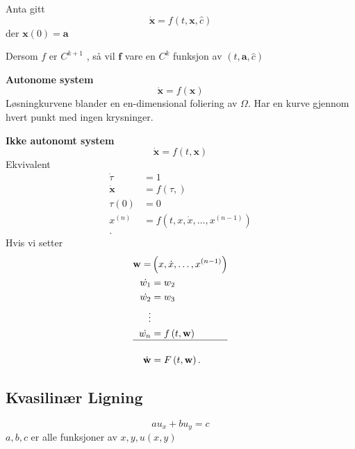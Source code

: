 \documentclass{article}
\theoremstyle{remark}
\newcommand{\newpara}
  {
  \vskip 0.4cm
  }
\begin{document}
\begin{theorem}
  Anta gitt \[
  \dot{\mathbf{x} } = f\left( t, \mathbf{x} , \hat{c} \right)
  \] 
  der $\mathbf{x}\left( 0 \right) = \mathbf{a}$ 
  \newpara
  Dersom $f$ er $C^{k+1}$ , så vil $\mathbf{f}$ vare en $C^{k}$ funksjon av $\left( t, \mathbf{a}, \hat{c} \right)$
\end{theorem}


\begin{tcolorbox}
  \textbf{Autonome system}  \[
\dot{\mathbf{x}} = f\left( \mathbf{x} \right)
  \] 
  Løsningkurvene blander en en-dimensional foliering av $\Omega $. Har en kurve gjennom hvert punkt med ingen krysninger.
  \newpara
  \textbf{Ikke autonomt system} 
  \[
  \dot{\mathbf{x}} = f\left( t, \mathbf{x} \right)
  \] 
  Ekvivalent 
  \begin{align*}
     \dot{\tau } &= 1 \\  
     \dot{\mathbf{x}}  & = f\left( \tau ,  \right)\\
    \tau \left( 0 \right) &= 0 \\ 
    x^{(n)} &= f\left( t, x, \dot{x} , \ldots, x^{(n-1)} \right) \\
  .\end{align*}
  Hvis vi setter 
  \begin{align*}
    \mathbf{w} = &  \left( x, \dot{x}, \ldots, x^{(n-1)} \right) \\
    \dot{w_{1}} &= w_{2} \\
    \dot{w_{2}} &=  w_{3} \\
    \vdots  & \\
    \dot{w_{n} }  & = f\left( t, \mathbf{w} \right) \\
    \hline \\
    \dot{\mathbf{w}} &= F\left(t, \mathbf{w}  \right)
  .\end{align*}
\end{tcolorbox}

\subsection{Kvasilinær Ligning}%
\label{sub:kvasi_linear_lining}

\[
au_{x} + b u_{y} = c
\] 
$a,b,c$ er alle funksjoner av  $x,y, u\left( x,y \right)$
\end{document}
